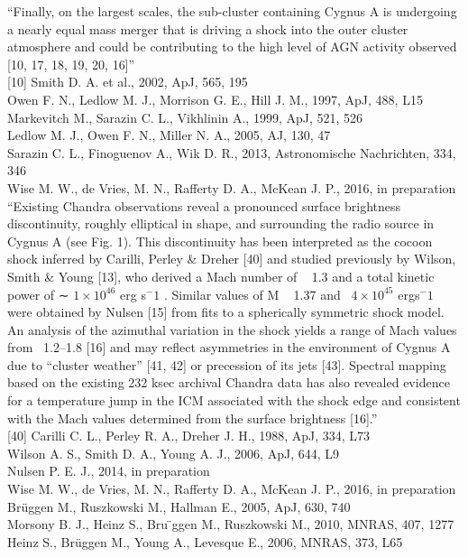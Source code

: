 \documentclass[MScProj_TLRH_ClusterEnergy.tex]{subfiles}
\begin{document}
``Finally, on the largest scales, the sub-cluster containing Cygnus A is undergoing a nearly equal mass merger that is driving a shock into the outer cluster atmosphere and could be contributing to the high level of AGN activity observed [10, 17, 18, 19, 20, 16]'' \\

[10] Smith D. A. et al., 2002, ApJ, 565, 195 \\
[17] Owen F. N., Ledlow M. J., Morrison G. E., Hill J. M., 1997, ApJ, 488, L15 \\
[18] Markevitch M., Sarazin C. L., Vikhlinin A., 1999, ApJ, 521, 526 \\
[19] Ledlow M. J., Owen F. N., Miller N. A., 2005, AJ, 130, 47 \\
[20] Sarazin C. L., Finoguenov A., Wik D. R., 2013, Astronomische Nachrichten, 334, 346 \\
[16] Wise M. W., de Vries, M. N., Rafferty D. A., McKean J. P., 2016, in preparation \\

``Existing Chandra observations reveal a pronounced surface brightness discontinuity, roughly elliptical in shape, and surrounding the radio source in Cygnus A (see Fig. 1). This discontinuity has been interpreted as the cocoon shock inferred by Carilli, Perley \& Dreher [40] and studied previously by Wilson, Smith \& Young [13], who derived a Mach number of ~ 1.3 and a total kinetic power of ∼ $1 \times 10^46$ erg s$^−1$ . Similar values of M ~ 1.37 and ~$4 \times 10^45$ ergs$^−1$ were obtained by Nulsen [15] from fits to a spherically symmetric shock model. An analysis of the azimuthal variation in the shock yields a range of Mach values from ~1.2–1.8 [16] and may reflect asymmetries in the environment of Cygnus A due to ``cluster weather'' [41, 42] or precession of its jets [43]. Spectral mapping based on the existing 232 ksec archival Chandra data has also revealed evidence for a temperature jump in the ICM associated with the shock edge and consistent with the Mach values determined from the surface brightness [16].'' \\

[40] Carilli C. L., Perley R. A., Dreher J. H., 1988, ApJ, 334, L73 \\
[13] Wilson A. S., Smith D. A., Young A. J., 2006, ApJ, 644, L9 \\
[15] Nulsen P. E. J., 2014, in preparation \\
[16] Wise M. W., de Vries, M. N., Rafferty D. A., McKean J. P., 2016, in preparation \\
[41] Brüggen M., Ruszkowski M., Hallman E., 2005, ApJ, 630, 740 \\
[42] Morsony B. J., Heinz S., Bru ̈ggen M., Ruszkowski M., 2010, MNRAS, 407, 1277 \\
[43] Heinz S., Brüggen M., Young A., Levesque E., 2006, MNRAS, 373, L65 \\
\end{document}
